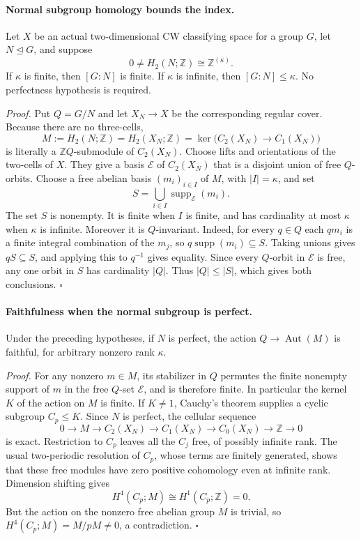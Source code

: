\paragraph{Normal subgroup homology bounds the index.}
Let $X$ be an actual two-dimensional CW classifying space for a
group $G$, let $N\trianglelefteq G$, and suppose
\[
       0\ne H_2(N;\mathbb Z)\cong\mathbb Z^{(\kappa)}.
\]
If $\kappa$ is finite, then $[G:N]$ is finite.
If $\kappa$ is infinite, then $[G:N]\leq\kappa$.
No perfectness hypothesis is required.

\emph{Proof.}
Put $Q=G/N$ and let $X_N\to X$ be the corresponding regular
cover. Because there are no three-cells,
\[
 M:=H_2(N;\mathbb Z)=H_2(X_N;\mathbb Z)
       =\ker\bigl(C_2(X_N)\to C_1(X_N)\bigr)
\]
is literally a $\mathbb ZQ$-submodule of $C_2(X_N)$.
Choose lifts and orientations of the two-cells of $X$.
They give a basis $\mathcal E$ of $C_2(X_N)$ that is a
disjoint union of free $Q$-orbits. Choose a free abelian
basis $(m_i)_{i\in I}$ of $M$, with $|I|=\kappa$, and set
\[
                  S=\bigcup_{i\in I}\operatorname{supp}_{\mathcal E}(m_i).
\]
The set $S$ is nonempty. It is finite when $I$ is finite,
and has cardinality at most $\kappa$ when $\kappa$ is
infinite. Moreover it is $Q$-invariant. Indeed, for every
$q\in Q$ each $qm_i$ is a finite integral combination of
the $m_j$, so $q\operatorname{supp}(m_i)\subseteq S$.
Taking unions gives $qS\subseteq S$, and applying this to
$q^{-1}$ gives equality. Since every $Q$-orbit in
$\mathcal E$ is free, any one orbit in $S$ has cardinality
$|Q|$. Thus $|Q|\leq|S|$, which gives both conclusions.
\hfill$\square$

\paragraph{Faithfulness when the normal subgroup is perfect.}
Under the preceding hypotheses, if $N$ is perfect, the
action $Q\to\operatorname{Aut}(M)$ is faithful, for
arbitrary nonzero rank $\kappa$.

\emph{Proof.}
For any nonzero $m\in M$, its stabilizer in $Q$ permutes
the finite nonempty support of $m$ in the free $Q$-set
$\mathcal E$, and is therefore finite. In particular the
kernel $K$ of the action on $M$ is finite. If $K\ne1$,
Cauchy's theorem supplies a cyclic subgroup $C_p\leq K$.
Since $N$ is perfect, the cellular sequence
\[
 0\longrightarrow M\longrightarrow C_2(X_N)
  \longrightarrow C_1(X_N)\longrightarrow C_0(X_N)
  \longrightarrow\mathbb Z\longrightarrow0
\]
is exact. Restriction to $C_p$ leaves all the $C_j$ free,
of possibly infinite rank. The usual two-periodic
resolution of $C_p$, whose terms are finitely generated,
shows that these free modules have zero positive
cohomology even at infinite rank. Dimension shifting gives
\[
 H^4(C_p;M)\cong H^1(C_p;\mathbb Z)=0.
\]
But the action on the nonzero free abelian group $M$ is
trivial, so $H^4(C_p;M)=M/pM\ne0$, a contradiction.
\hfill$\square$
